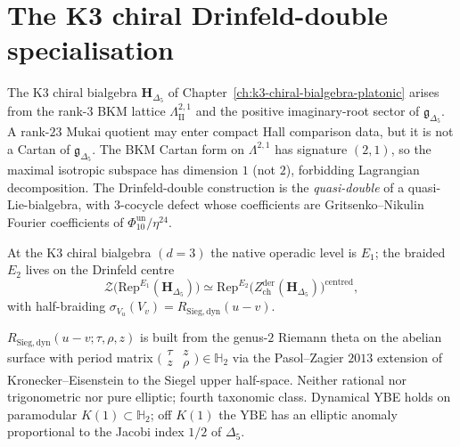 \section{The K3 chiral Drinfeld-double specialisation}
\label{sec:dc-K3-drinfeld-specialisation}

\begin{remark}
\label{rem:dc-manin-pair}
The K3 chiral bialgebra $\mathbf{H}_{\Delta_5}$ of Chapter~\ref{ch:k3-chiral-bialgebra-platonic} arises from the rank-$3$ BKM lattice $\Lambda^{2,1}_{\mathrm{II}}$ and the positive imaginary-root sector of $\mathfrak{g}_{\Delta_5}$. A rank-$23$ Mukai quotient may enter compact Hall comparison data, but it is not a Cartan of $\mathfrak{g}_{\Delta_5}$. The BKM Cartan form on $\Lambda^{2,1}$ has signature $(2,1)$, so the maximal isotropic subspace has dimension $1$ (not $2$), forbidding Lagrangian decomposition. The Drinfeld-double construction is the \emph{quasi-double} of a quasi-Lie-bialgebra, with $3$-cocycle defect whose coefficients are Gritsenko--Nikulin Fourier coefficients of $\Phi_{10}^{\mathrm{un}}/\eta^{24}$.
\end{remark}

\begin{remark}[\texorpdfstring{$E_2$}{E-2}-braiding via Drinfeld centre at \texorpdfstring{$d=3$}{d=3}]
\label{rem:dc-e2-braiding}
At the K3 chiral bialgebra $(d=3)$ the native operadic level is $E_1$; the braided $E_2$ lives on the Drinfeld centre
\[
 \mathcal{Z}\bigl(\mathrm{Rep}^{E_1}(\mathbf{H}_{\Delta_5})\bigr)
 \simeq
 \mathrm{Rep}^{E_2}\bigl(Z^{\mathrm{der}}_{\mathrm{ch}}(\mathbf{H}_{\Delta_5})\bigr)^{\mathrm{centred}},
\]
with half-braiding $\sigma_{V_u}(V_v)=R_{\mathrm{Sieg,dyn}}(u-v)$.
\end{remark}

\begin{remark}
\label{rem:dc-r-sieg}
$R_{\mathrm{Sieg,dyn}}(u-v;\tau,\rho,z)$ is built from the genus-$2$ Riemann theta on the abelian surface with period matrix $\bigl(\begin{smallmatrix}\tau & z\\ z & \rho\end{smallmatrix}\bigr)\in\mathbb{H}_2$ via the Pasol--Zagier $2013$ extension of Kronecker--Eisenstein to the Siegel upper half-space. Neither rational nor trigonometric nor pure elliptic; fourth taxonomic class. Dynamical YBE holds on paramodular $K(1)\subset\mathbb{H}_2$; off $K(1)$ the YBE has an elliptic anomaly proportional to the Jacobi index $1/2$ of $\Delta_5$.
\end{remark}

